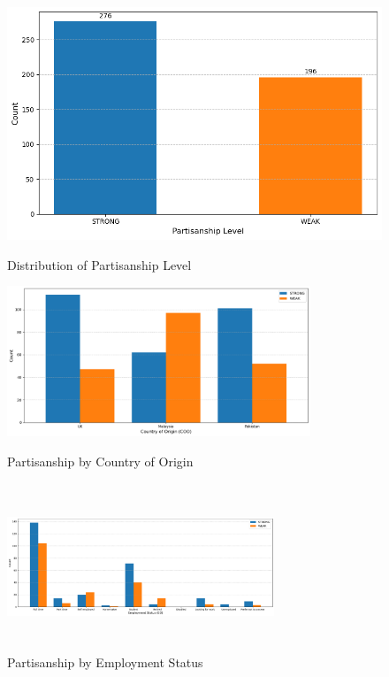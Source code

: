 \documentclass[pt]{article}  %
\begin{document}
\begin{figure}[H]
    \centering
    \begin{minipage}[b]{0.45\textwidth}
        \centering
        \includegraphics[width=\textwidth]{partisanship-distribuiton.png}
        \caption{Distribution of Partisanship Level} %
        \label{fig:partisanship-distribuiton} %
    \end{minipage}
    \hfill
    \begin{minipage}[b]{0.45\textwidth}
        \centering
        \vspace{-20cm}
        \includegraphics[width=\textwidth, height=4.5cm]{partisanship-distribuiton-by-coo.png}
         \caption{Partisanship by Country of Origin} %
        \label{fig:partisanship-coo} %
    \end{minipage}

    \vspace{1cm} %

    \centering  
    \begin{minipage}[b]{0.6\textwidth} %
        \centering
        \includegraphics[width=8cm, height=5cm]{partisanship-distribuiton-by-employment-status.png}
        \caption{Partisanship by Employment Status} %
        \label{fig:partisanship-distribuiton-by-employment-status} %


\end{minipage}
\end{figure}
\end{document}
